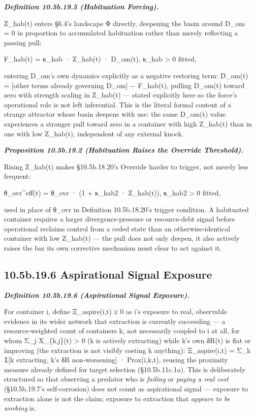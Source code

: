\documentclass[
]{article}
\begin{document}
\emph{\textbf{Definition 10.5b.19.5 (Habituation Forcing).}}

Z\_hab(t) enters §6.4's landscape Φ directly, deepening the basin around
D\_om = 0 in proportion to accumulated habituation rather than merely
reflecting a passing pull:

F\_hab(t) = κ\_hab · Z\_hab(t) · D\_om(t), κ\_hab \textgreater{} 0
fitted,

entering D\_om's own dynamics explicitly as a negative restoring term:
Ḋ\_om(t) = {[}other terms already governing D\_om{]} − F\_hab(t),
pulling D\_om(t) toward zero with strength scaling in Z\_hab(t) ---
stated explicitly here so the force's operational role is not left
inferential. This is the literal formal content of a strange attractor
whose basin deepens with use: the same D\_om(t) value experiences a
stronger pull toward zero in a container with high Z\_hab(t) than in one
with low Z\_hab(t), independent of any external knock.

\emph{\textbf{Proposition 10.5b.19.2 (Habituation Raises the Override
Threshold).}}

Rising Z\_hab(t) makes §10.5b.18.20's Override harder to trigger, not
merely less frequent:

θ\_ovr\^{}eff(t) = θ\_ovr · (1 + κ\_hab2 · Z\_hab(t)), κ\_hab2
\textgreater{} 0 fitted,

used in place of θ\_ovr in Definition 10.5b.18.20's trigger condition. A
habituated container requires a larger divergence-pressure or
resource-debt signal before operational reclaims control from a ceded
state than an otherwise-identical container with low Z\_hab(t) --- the
pull does not only deepen, it also actively raises the bar its own
corrective mechanism must clear to act against it.

\hypertarget{b.19.6-aspirational-signal-exposure}{%
\subsection{10.5b.19.6 Aspirational Signal
Exposure}\label{b.19.6-aspirational-signal-exposure}}

\emph{\textbf{Definition 10.5b.19.6 (Aspirational Signal Exposure).}}

For container i, define Ξ\_aspire(i,t) ≥ 0 as i's exposure to real,
observable evidence in its wider network that extraction is currently
succeeding --- a resource-weighted count of containers k, not
necessarily coupled to i at all, for whom Σ\_j X\_\{k,j\}(t)
\textgreater{} 0 (k is actively extracting) while k's own δR(t) is flat
or improving (the extraction is not visibly costing k anything):
Ξ\_aspire(i,t) = Σ\_k 𝟙{[}k extracting, k's δR non-worsening{]} ·
Prox(i,k,t), reusing the proximity measure already defined for target
selection (§10.5b.11c.1a). This is deliberately structured so that
observing a predator who is \emph{failing} or \emph{paying a real cost}
(§10.5b.19.7's self-corrosion) does not count as aspirational signal ---
exposure to extraction alone is not the claim; exposure to extraction
that \emph{appears to be working} is.
\end{document}
